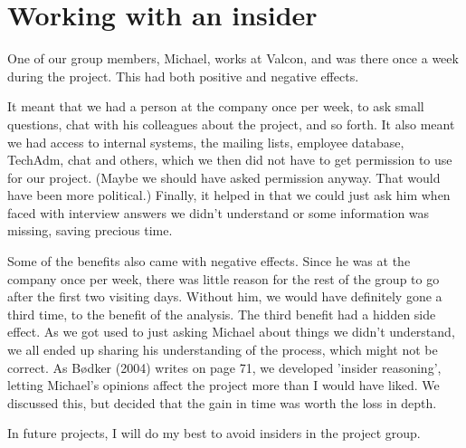 \section*{Working with an insider}
One of our group members, Michael, works at Valcon, and was there once a week during the project.
This had both positive and negative effects.

It meant that we had a person at the company once per week, to ask small questions, chat with his colleagues about the project, and so forth.
It also meant we had access to internal systems, the mailing lists, employee database, TechAdm, chat and others, which we then did not have to get permission to use for our project.
(Maybe we should have asked permission anyway. That would have been more political.)
Finally, it helped in that we could just ask him when faced with interview answers we didn't understand or some information was missing, saving precious time.

Some of the benefits also came with negative effects.
Since he was at the company once per week, there was little reason for the rest of the group to go after the first two visiting days.
Without him, we would have definitely gone a third time, to the benefit of the analysis.
The third benefit had a hidden side effect.
As we got used to just asking Michael about things we didn't understand, we all ended up sharing his understanding of the process, which might not be correct.
As Bødker (2004) writes on page 71, we developed 'insider reasoning', letting Michael's opinions affect the project more than I would have liked.
We discussed this, but decided that the gain in time was worth the loss in depth.

In future projects, I will do my best to avoid insiders in the project group.